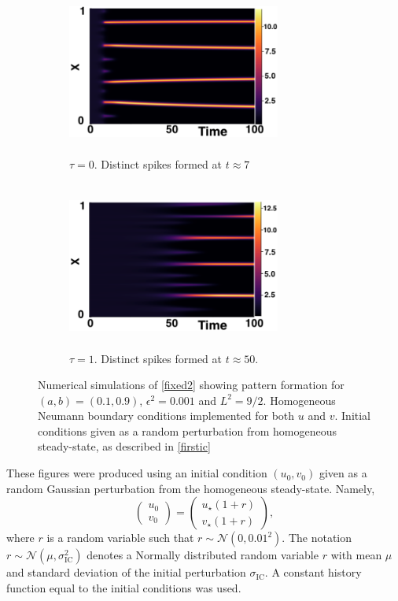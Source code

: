 \begin{figure}[H]
    \centering
    \begin{subfigure}[b]{0.45\textwidth}
        \centering
        \includegraphics[width=7cm,height = 5.5cm]{patt1.png}
        \caption{$\tau=0$. Distinct spikes formed at $t\approx7$ }
        \label{}
    \end{subfigure}
    \hfill
    \begin{subfigure}[b]{0.45\textwidth}
        \centering
        \includegraphics[width=7cm,height = 5.5cm]{patt2.png}
        \caption{$\tau=1$. Distinct spikes formed at $t\approx50$.}
        \label{}
    \end{subfigure}
    \caption{Numerical simulations of \eqref{fixed2} showing pattern formation for $(a,b)=(0.1,0.9)$, $\epsilon^2=0.001$ and $L^2=9/2$. Homogeneous Neumann boundary conditions implemented for both $u$ and $v$. Initial conditions given as a random perturbation from homogeneous steady-state, as described in \eqref{firstic}}
    \label{fig:fixedsim2}
\end{figure}
These figures were produced using an initial condition $(u_0,v_0)$ given as a random Gaussian perturbation from the homogeneous steady-state. Namely,
\begin{equation}\label{firstic}
\begin{pmatrix}u_0\\v_0\end{pmatrix}=\begin{pmatrix}u_\star(1+r)\\v_\star(1+r)\end{pmatrix},
\end{equation}
where $r$ is a random variable such that $r\sim\mathcal{N}\left(0,0.01^2\right)$. The notation $r\sim\mathcal{N}\left(\mu,\sigma_{\text{IC}}^2\right)$ denotes a Normally distributed random variable $r$ with mean $\mu$ and standard deviation of the initial perturbation $\sigma_{\text{IC}}$. A constant history function equal to the initial conditions was used.
